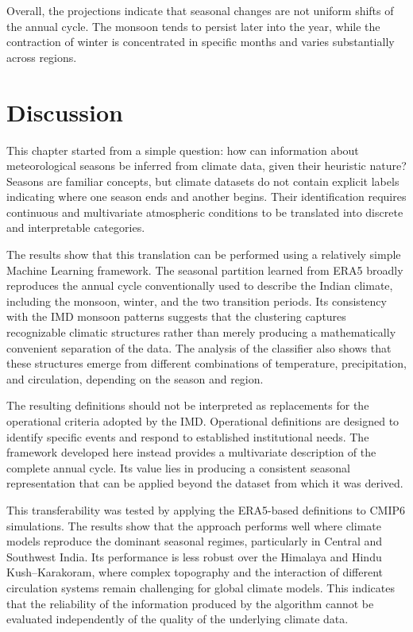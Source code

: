 Overall, the projections indicate that seasonal changes are not uniform shifts of the annual cycle. The monsoon tends to persist later into the year, while the contraction of winter is concentrated in specific months and varies substantially across regions. 



\section{Discussion}

This chapter started from a simple question: how can information about meteorological seasons be inferred from climate data, given their heuristic nature? Seasons are familiar concepts, but climate datasets do not contain explicit labels indicating where one season ends and another begins. Their identification requires continuous and multivariate atmospheric conditions to be translated into discrete and interpretable categories.

The results show that this translation can be performed using a relatively simple Machine Learning framework. The seasonal partition learned from ERA5 broadly reproduces the annual cycle conventionally used to describe the Indian climate, including the monsoon, winter, and the two transition periods. Its consistency with the IMD monsoon patterns suggests that the clustering captures recognizable climatic structures rather than merely producing a mathematically convenient separation of the data. The analysis of the classifier also shows that these structures emerge from different combinations of temperature, precipitation, and circulation, depending on the season and region.

The resulting definitions should not be interpreted as replacements for the operational criteria adopted by the IMD. Operational definitions are designed to identify specific events and respond to established institutional needs. The framework developed here instead provides a multivariate description of the complete annual cycle. Its value lies in producing a consistent seasonal representation that can be applied beyond the dataset from which it was derived.

This transferability was tested by applying the ERA5-based definitions to CMIP6 simulations. The results show that the approach performs well where climate models reproduce the dominant seasonal regimes, particularly in Central and Southwest India. Its performance is less robust over the Himalaya and Hindu Kush--Karakoram, where complex topography and the interaction of different circulation systems remain challenging for global climate models. This indicates that the reliability of the information produced by the algorithm cannot be evaluated independently of the quality of the underlying climate data.

